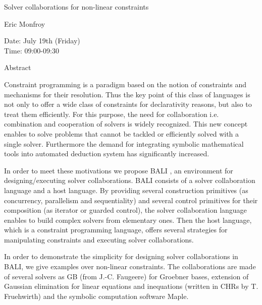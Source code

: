 \begin{center}
\LARGE
Solver collaborations for non-linear constraints
\end{center}

\begin{center}
\Large
Eric Monfroy

\end{center}

\noindent
Date:  July 19th (Friday)\\
Time:  09:00-09:30\\

\begin{center}
\large
Abstract
\end{center}

Constraint programming is a paradigm based on the notion of constraints and mechanisms for their
resolution. Thus the key point of this class of languages is not only to offer a wide class of
constraints for declarativity reasons, but also to treat them efficiently. For this purpose, the need
for collaboration i.e. combination and cooperation of solvers is widely recognized. This new
concept enables to solve problems that cannot be tackled or efficiently solved with a single solver.
Furthermore the demand for integrating symbolic mathematical tools into automated deduction
system has significantly increased. 

In order to meet these motivations we propose BALI , an environment for designing/executing
solver collaborations. BALI consists of a solver collaboration language and a host language. By
providing several construction primitives (as concurrency, parallelism and sequentiality) and
several control primitives for their composition (as iterator or guarded control), the solver
collaboration language enables to build complex solvers from elementary ones. Then the host
language, which is a constraint programming language, offers several strategies for manipulating
constraints and executing solver collaborations. 

In order to demonstrate the simplicity for designing solver collaborations in BALI, we give
examples over non-linear constraints. The collaborations are made of several solvers as GB (from
J.-C. Faugeere) for Groebner bases, extension of Gaussian elimination for linear equations and
inequations (written in CHRs by T. Fruehwirth) and the symbolic computation software Maple. 

